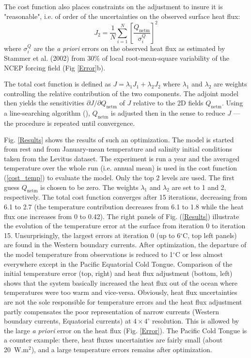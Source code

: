 The cost function also places constraints on the adjustment to insure it is
"reasonable", i.e. of order of the uncertainties on the observed surface heat
flux: 
\begin{equation}
J_2 = \frac{1}{N} \sum_{i=1}^N \left[\frac{Q_\mathrm{netm}}{\sigma^Q_i} \right]^2
\end{equation}
where $\sigma^Q_i$ are the {\it a priori} errors on the observed heat flux as
estimated by Stammer et al. (2002) from 30\% of local root-mean-square
variability of the NCEP forcing field (Fig \ref{Error}b).

The total cost function is defined as $J=\lambda_1 J_1+ \lambda_2 J_2$ where
$\lambda_1$ and $\lambda_2$ are weights controlling the relative contribution
of the two components. The adjoint model then yields the sensitivities
$\partial J/\partial Q_\mathrm{netm}$ of $J$ relative to the 2D fields
$Q_\mathrm{netm}$. Using a line-searching algorithm (\cite{gil-lem:89}),
$Q_\mathrm{netm}$ is adjusted then in the sense to
reduce $J$ --- the procedure is repeated until convergence.


Fig. \ref{Results} shows the results of such an optimization. The
model is started from rest and from January-mean temperature and salinity
initial conditions taken from the Levitus dataset. The experiment is run a year
and the averaged temperature over the whole run (i.e. annual mean) is used
in the cost function (\ref{cost_temp}) to evaluate the model. Only the
top 2 levels are used. The first guess $Q_\mathrm{netm}$ is chosen to be
zero. The weights $\lambda_1$ and $\lambda_2$ are set to 1 and 2, respectively.
The total cost function converges after 15 iterations, decreasing from 6.1 to
2.7 (the temperature contribution decreases from 6.1 to 1.8 while the heat
flux one increases from 0 to 0.42). The right panels of Fig. (\ref{Results})
illustrate the evolution of the temperature error at the surface from
iteration 0 to iteration 15. Unsurprisingly, the largest errors at iteration 0
(up to 6$^\circ$C, top left panels) are found in the Western boundary
currents. After optimization, the departure of the model temperature from
observations is reduced to 1$^\circ$C or less almost everywhere except in the
Pacific Equatorial Cold Tongue. Comparison of the initial temperature
error (top, right) and heat flux adjustment (bottom, left) shows that the
system basically increased the heat flux out of the ocean where temperatures
were too warm and vice-versa. Obviously, heat flux uncertainties are not the
sole responsible for temperature errors and the heat flux adjustment partly
compensates the poor representation of narrow currents (Western boundary
currents, Equatorial currents) at $4\times4^\circ$ resolution. This is
allowed by the large {\it a priori} error on the heat flux (Fig. \ref{Error}).
The Pacific Cold Tongue is a counter example: there, heat fluxes uncertainties
are fairly small (about 20~W.m$^2$), and a large temperature errors 
remains after optimization.

